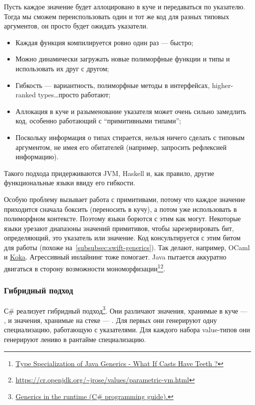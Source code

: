 Пусть каждое значение будет аллоцировано в куче и передаваться по указателю.
Тогда мы сможем переиспользовать один и тот же код для разных типовых аргументов, он просто будет ожидать указатели.

\begin{itemize}
    \item[\positive] Каждая функция компилируется ровно один раз --- быстро;
    \item[\positive] Можно динамически загружать новые полиморфные функции и типы и использовать их друг с другом;
    \item[\positive] Гибкость --- вариантность, полиморфные методы в интерфейсах, higher-ranked types\ldots просто работают;
    \item[\negative] Аллокация в куче и разыменование указателя может очень сильно замедлить код, особенно работающий с ``примитивными типами'';
    \item[\negative] Поскольку информация о типах стирается, нельзя ничего сделать с типовым аргументом, не имея его обитателей (например, запросить рефлексией информацию).
\end{itemize}

Такого подхода придерживаются JVM, Haskell и, как правило, другие функциональные языки ввиду его гибкости.

Особую проблему вызывает работа с примитивами, потому что каждое значение приходится сначала боксить (переносить в кучу), а потом уже использовать в полиморфном контексте.
Поэтому языки борются с этим как могут.
Некоторые языки урезают диапазоны значений примитивов, чтобы зарезервировать бит, определяющий, это указатель или значение.
Код консультируется с этим битом для работы (похоже на~\ref{subsubsec:swift-generics}).
Так делают, например, OCaml и \href{https://koka-lang.github.io/koka/doc/book.html#sec-value-types}{Koka}.
Агрессивный инлайнинг тоже помогает.
Java пытается аккуратно двигаться в сторону возможности мономорфизации\footnote{\href{https://youtu.be/JI09cs2yUgY?si=MLkRs31mN1koXIu1}{Type Specialization of Java Generics - What If Casts Have Teeth ?}}\footnote{\url{https://cr.openjdk.org/~jrose/values/parametric-vm.html}}.

\subsubsection{Гибридный подход} \label{subsubsec:hybrid}

С\# реализует гибридный подход\footnote{\href{https://learn.microsoft.com/en-us/dotnet/csharp/programming-guide/generics/generics-in-the-run-time}{Generics in the runtime (C\# programming guide).}}.
Они различают значения, хранимые в куче --- , и значения, хранимые на стеке --- .
Для первых они генерируют одну специализацию, работающую с указателями.
Для каждого набора value-типов они генерируют лениво в рантайме специализацию.

